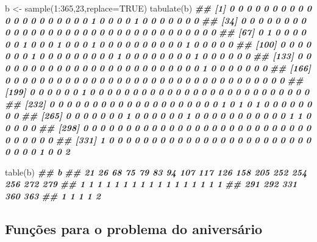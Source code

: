 \documentclass[
  11pt]{report}
\newenvironment{Shaded}{\begin{snugshade}}{\end{snugshade}}
\newcommand{\AttributeTok}[1]{\textcolor[rgb]{0.77,0.63,0.00}{#1}}
\newcommand{\ConstantTok}[1]{\textcolor[rgb]{0.00,0.00,0.00}{#1}}
\newcommand{\DecValTok}[1]{\textcolor[rgb]{0.00,0.00,0.81}{#1}}
\newcommand{\DocumentationTok}[1]{\textcolor[rgb]{0.56,0.35,0.01}{\textbf{\textit{#1}}}}
\newcommand{\FunctionTok}[1]{\textcolor[rgb]{0.00,0.00,0.00}{#1}}
\newcommand{\NormalTok}[1]{#1}
\newcommand{\OtherTok}[1]{\textcolor[rgb]{0.56,0.35,0.01}{#1}}
\newcommand{\SpecialCharTok}[1]{\textcolor[rgb]{0.00,0.00,0.00}{#1}}
\renewenvironment{Shaded}{
    \begin{mdframed}[%
      roundcorner=2pt,%
      innerleftmargin=5pt,%
      innerrightmargin=5pt,%
      topline=true,%
      leftline=true,%
      rightline=true,%
      bottomline=true,%
      linewidth=0.5pt,%
      linecolor=black!20,%
      backgroundcolor=black!2,%
      skipabove=2ex,%
      skipbelow=2.5ex%
    ]%
  }
  {
    \end{mdframed}
  }
\begin{document}
\begin{Shaded}
\begin{Highlighting}[]
\NormalTok{b }\OtherTok{\textless{}{-}} \FunctionTok{sample}\NormalTok{(}\DecValTok{1}\SpecialCharTok{:}\DecValTok{365}\NormalTok{,}\DecValTok{23}\NormalTok{,}\AttributeTok{replace=}\ConstantTok{TRUE}\NormalTok{)}
\FunctionTok{tabulate}\NormalTok{(b)}
\DocumentationTok{\#\#   [1] 0 0 0 0 0 0 0 0 0 0 0 0 0 0 0 0 0 0 0 0 1 0 0 0 0 1 0 0 0 0 0 0 0}
\DocumentationTok{\#\#  [34] 0 0 0 0 0 0 0 0 0 0 0 0 0 0 0 0 0 0 0 0 0 0 0 0 0 0 0 0 0 0 0 0 0}
\DocumentationTok{\#\#  [67] 0 1 0 0 0 0 0 0 1 0 0 0 1 0 0 0 1 0 0 0 0 0 0 0 0 0 0 1 0 0 0 0 0}
\DocumentationTok{\#\# [100] 0 0 0 0 0 0 0 1 0 0 0 0 0 0 0 0 0 1 0 0 0 0 0 0 0 0 1 0 0 0 0 0 0}
\DocumentationTok{\#\# [133] 0 0 0 0 0 0 0 0 0 0 0 0 0 0 0 0 0 0 0 0 0 0 0 0 0 1 0 0 0 0 0 0 0}
\DocumentationTok{\#\# [166] 0 0 0 0 0 0 0 0 0 0 0 0 0 0 0 0 0 0 0 0 0 0 0 0 0 0 0 0 0 0 0 0 0}
\DocumentationTok{\#\# [199] 0 0 0 0 0 0 1 0 0 0 0 0 0 0 0 0 0 0 0 0 0 0 0 0 0 0 0 0 0 0 0 0 0}
\DocumentationTok{\#\# [232] 0 0 0 0 0 0 0 0 0 0 0 0 0 0 0 0 0 0 0 0 1 0 1 0 1 0 0 0 0 0 0 0 0}
\DocumentationTok{\#\# [265] 0 0 0 0 0 0 0 1 0 0 0 0 0 0 1 0 0 0 0 0 0 0 0 0 0 0 1 1 0 0 0 0 0}
\DocumentationTok{\#\# [298] 0 0 0 0 0 0 0 0 0 0 0 0 0 0 0 0 0 0 0 0 0 0 0 0 0 0 0 0 0 0 0 0 0}
\DocumentationTok{\#\# [331] 1 0 0 0 0 0 0 0 0 0 0 0 0 0 0 0 0 0 0 0 0 0 0 0 0 0 0 0 0 1 0 0 2}
\end{Highlighting}
\end{Shaded}

\begin{Shaded}
\begin{Highlighting}[]
\FunctionTok{table}\NormalTok{(b)}
\DocumentationTok{\#\# b}
\DocumentationTok{\#\#  21  26  68  75  79  83  94 107 117 126 158 205 252 254 256 272 279 }
\DocumentationTok{\#\#   1   1   1   1   1   1   1   1   1   1   1   1   1   1   1   1   1 }
\DocumentationTok{\#\# 291 292 331 360 363 }
\DocumentationTok{\#\#   1   1   1   1   2}
\end{Highlighting}
\end{Shaded}

\hypertarget{funuxe7uxf5es-para-o-problema-do-aniversuxe1rio}{%
\subsection*{Funções para o problema do aniversário}\label{funuxe7uxf5es-para-o-problema-do-aniversuxe1rio}}
\end{document}
